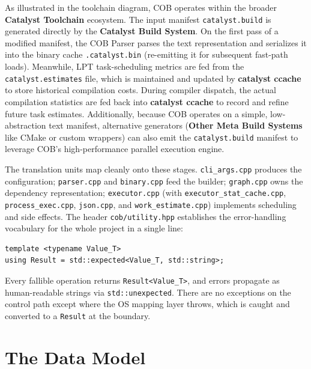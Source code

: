 \documentclass[11pt]{article}
\begin{document}
\begin{center}
\resizebox{\textwidth}{!}{%
}
\end{center}

As illustrated in the toolchain diagram, COB operates within the broader \textbf{Catalyst Toolchain} ecosystem.
The input manifest \texttt{catalyst.build} is generated directly by the \textbf{Catalyst Build System}.
On the first pass of a modified manifest, the COB Parser parses the text representation and serializes it into the
binary cache \texttt{.catalyst.bin} (re-emitting it for subsequent fast-path loads).
Meanwhile, LPT task-scheduling metrics are fed from the \texttt{catalyst.estimates} file, which is maintained and
updated by \textbf{catalyst ccache} to store historical compilation costs. During compiler dispatch, the actual compilation
statistics are fed back into \textbf{catalyst ccache} to record and refine future task estimates. Additionally, because
COB operates on a simple, low-abstraction text manifest, alternative generators (\textbf{Other Meta Build Systems}
like CMake or custom wrappers) can also emit the \texttt{catalyst.build} manifest
to leverage COB's high-performance parallel execution engine.

The translation units map cleanly onto these stages. \texttt{cli\_args.cpp}
produces the configuration; \texttt{parser.cpp} and \texttt{binary.cpp} feed the
builder; \texttt{graph.cpp} owns the dependency representation;
\texttt{executor.cpp} (with \texttt{executor\_stat\_cache.cpp},
\texttt{process\_exec.cpp}, \texttt{json.cpp}, and \texttt{work\_estimate.cpp})
implements scheduling and side effects. The header
\texttt{cob/utility.hpp} establishes the error-handling vocabulary for the whole
project in a single line:

\begin{lstlisting}
template <typename Value_T>
using Result = std::expected<Value_T, std::string>;
\end{lstlisting}

Every fallible operation returns \lstinline|Result<Value_T>|, and errors propagate as
human-readable strings via \lstinline|std::unexpected|. There are no exceptions
on the control path except where the OS mapping layer throws, which is caught
and converted to a \lstinline|Result| at the boundary.

\section{The Data Model}
\end{document}
